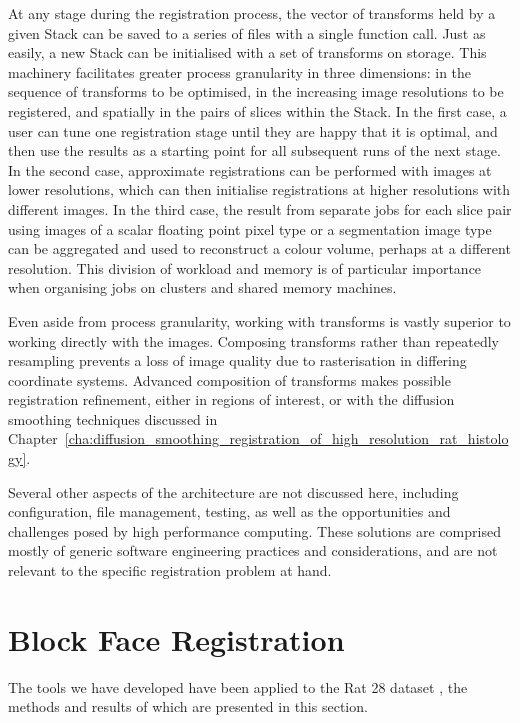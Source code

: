       At any stage during the registration process, the vector of transforms held by a given Stack can be saved to a series of files with a single function call. Just as easily, a new Stack can be initialised with a set of transforms on storage. This machinery facilitates greater process granularity in three dimensions: in the sequence of transforms to be optimised, in the increasing image resolutions to be registered, and spatially in the pairs of slices within the Stack. In the first case, a user can tune one registration stage until they are happy that it is optimal, and then use the results as a starting point for all subsequent runs of the next stage. In the second case, approximate registrations can be performed with images at lower resolutions, which can then initialise registrations at higher resolutions with different images. In the third case, the result from separate jobs for each slice pair using images of a scalar floating point pixel type or a segmentation image type can be aggregated and used to reconstruct a colour volume, perhaps at a different resolution. This division of workload and memory is of particular importance when organising jobs on clusters and shared memory machines.
			
			Even aside from process granularity, working with transforms is vastly superior to working directly with the images. Composing transforms rather than repeatedly resampling prevents a loss of image quality due to rasterisation in differing coordinate systems. Advanced composition of transforms makes possible registration refinement, either in regions of interest, or with the diffusion smoothing techniques discussed in Chapter~\ref{cha:diffusion_smoothing_registration_of_high_resolution_rat_histology}.
          
      Several other aspects of the architecture are not discussed here, including configuration, file management, testing, as well as the opportunities and challenges posed by high performance computing. These solutions are comprised mostly of generic software engineering practices and considerations, and are not relevant to the specific registration problem at hand.

\section{Block Face Registration} %
\label{sec:block_face_registration}
  The tools we have developed have been applied to the Rat 28 dataset \cite{Burton2006}, the methods and results of which are presented in this section.
